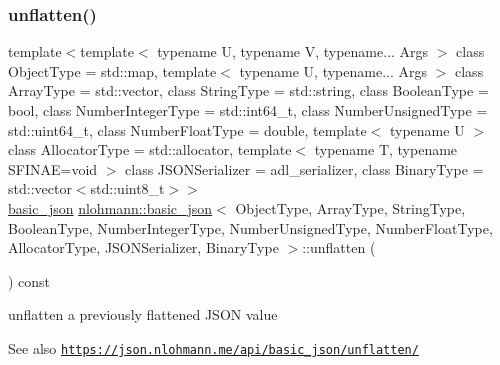 \subsubsection{\texorpdfstring{unflatten()}{unflatten()}}
{\footnotesize\ttfamily template$<$template$<$ typename U, typename V, typename... Args $>$ class Object\+Type = std\+::map, template$<$ typename U, typename... Args $>$ class Array\+Type = std\+::vector, class String\+Type  = std\+::string, class Boolean\+Type  = bool, class Number\+Integer\+Type  = std\+::int64\+\_\+t, class Number\+Unsigned\+Type  = std\+::uint64\+\_\+t, class Number\+Float\+Type  = double, template$<$ typename U $>$ class Allocator\+Type = std\+::allocator, template$<$ typename T, typename S\+F\+I\+N\+A\+E=void $>$ class J\+S\+O\+N\+Serializer = adl\+\_\+serializer, class Binary\+Type  = std\+::vector$<$std\+::uint8\+\_\+t$>$$>$ \\
\hyperlink{classnlohmann_1_1basic__json}{basic\+\_\+json} \hyperlink{classnlohmann_1_1basic__json}{nlohmann\+::basic\+\_\+json}$<$ Object\+Type, Array\+Type, String\+Type, Boolean\+Type, Number\+Integer\+Type, Number\+Unsigned\+Type, Number\+Float\+Type, Allocator\+Type, J\+S\+O\+N\+Serializer, Binary\+Type $>$\+::unflatten (\begin{DoxyParamCaption}{ }\end{DoxyParamCaption}) const\hspace{0.3cm}{\ttfamily [inline]}}



unflatten a previously flattened J\+S\+ON value 

\begin{DoxySeeAlso}{See also}
\href{https://json.nlohmann.me/api/basic_json/unflatten/}{\tt https\+://json.\+nlohmann.\+me/api/basic\+\_\+json/unflatten/} 
\end{DoxySeeAlso}
\mbox{\label{classnlohmann_1_1basic__json_a129a235796b3f95ec93d65c5e4e9fa41}} 
